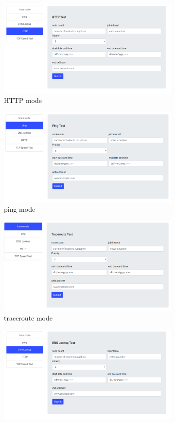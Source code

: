 \begin{figure}
	\begin{subfigure}{.5\textwidth}
		\centering
		\includegraphics[width=.8\linewidth]{images/http}
		\caption{HTTP mode}
		\label{fig:sfig1}
	\end{subfigure}
	\begin{subfigure}{.5\textwidth}
		\centering
		\includegraphics[width=.8\linewidth]{images/ping}
		\caption{ping mode}
		\label{fig:sfig2}
	\end{subfigure}
	\begin{subfigure}{.5\textwidth}
	\centering
	\includegraphics[width=.8\linewidth]{images/troute}
	\caption{traceroute mode}
	\label{fig:sfig3}
\end{subfigure}
	\begin{subfigure}{.5\textwidth}
	\centering
	\includegraphics[width=.8\linewidth]{images/dlookup}

\end{subfigure}
\end{figure}
